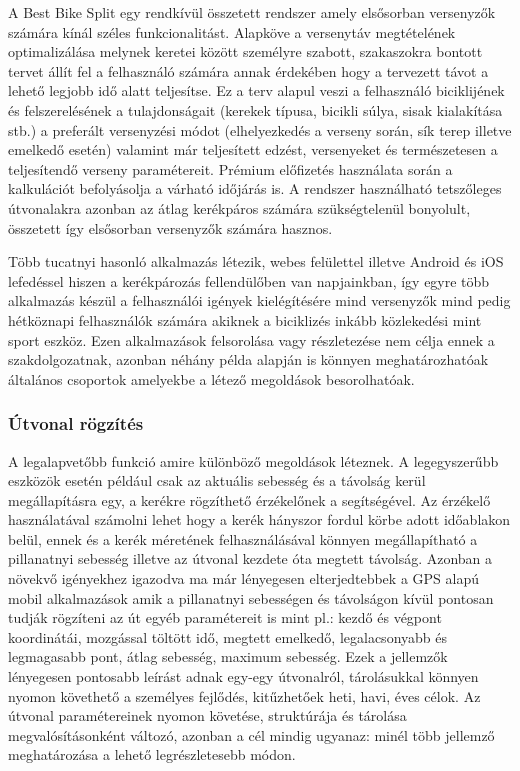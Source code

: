 A Best Bike Split \cite{bestbikesplit} egy rendkívül összetett rendszer amely elsősorban versenyzők számára kínál széles funkcionalitást. Alapköve a versenytáv megtételének optimalizálása melynek keretei között személyre szabott, szakaszokra bontott tervet állít fel a felhasználó számára annak érdekében hogy a tervezett távot a lehető legjobb idő alatt teljesítse. Ez a terv alapul veszi a felhasználó biciklijének és felszerelésének a tulajdonságait (kerekek típusa, bicikli súlya, sisak kialakítása stb.) a preferált versenyzési módot (elhelyezkedés a verseny során, sík terep illetve emelkedő esetén) valamint már teljesített edzést, versenyeket és természetesen a teljesítendő verseny paramétereit. Prémium előfizetés használata során a kalkulációt befolyásolja a várható időjárás is. A rendszer használható tetszőleges útvonalakra azonban az átlag kerékpáros számára szükségtelenül bonyolult, összetett így elsősorban versenyzők számára hasznos.

Több tucatnyi hasonló alkalmazás létezik, webes felülettel illetve Android és iOS lefedéssel hiszen a kerékpározás fellendülőben van napjainkban, így egyre több alkalmazás készül a felhasználói igények kielégítésére mind versenyzők mind pedig hétköznapi felhasználók számára akiknek a biciklizés inkább közlekedési mint sport eszköz. Ezen alkalmazások felsorolása vagy részletezése nem célja ennek a szakdolgozatnak, azonban néhány példa alapján is könnyen meghatározhatóak általános csoportok amelyekbe a létező megoldások besorolhatóak.




\subsubsection{Útvonal rögzítés} 
A legalapvetőbb funkció amire különböző megoldások léteznek. A legegyszerűbb eszközök esetén például csak az aktuális sebesség és a távolság kerül megállapításra egy, a kerékre rögzíthető érzékelőnek a segítségével. Az érzékelő használatával számolni lehet hogy a kerék hányszor fordul körbe adott időablakon belül, ennek és a kerék méretének felhasználásával könnyen megállapítható a pillanatnyi sebesség illetve az útvonal kezdete óta megtett távolság. Azonban a növekvő igényekhez igazodva ma már lényegesen elterjedtebbek a GPS alapú mobil alkalmazások amik a pillanatnyi sebességen és távolságon kívül pontosan tudják rögzíteni az út egyéb paramétereit is mint pl.: kezdő és végpont koordinátái, mozgással töltött idő, megtett emelkedő, legalacsonyabb és legmagasabb pont, átlag sebesség, maximum sebesség. Ezek a jellemzők lényegesen pontosabb leírást adnak egy-egy útvonalról, tárolásukkal könnyen nyomon követhető a személyes fejlődés, kitűzhetőek heti, havi, éves célok. Az útvonal paramétereinek nyomon követése, struktúrája és tárolása megvalósításonként változó, azonban a cél mindig ugyanaz: minél több jellemző meghatározása a lehető legrészletesebb módon.

